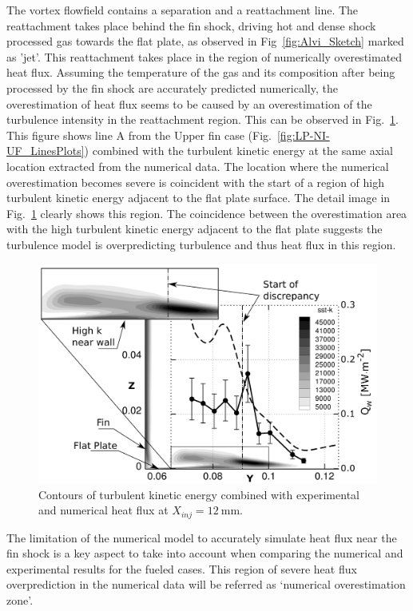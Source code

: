\documentclass{AIAA}
\begin{document}
The vortex flowfield contains a separation and a reattachment line.
The reattachment takes place behind the fin shock, driving hot and dense shock processed gas towards the flat plate, as observed in Fig~\ref{fig:Alvi_Sketch} marked as 'jet'.
This reattachment takes place in the region of numerically overestimated heat flux. 
Assuming the temperature of the gas and its composition after being processed by the fin shock are accurately predicted numerically, the overestimation of heat flux seems to be caused by an overestimation of the turbulence intensity in the reattachment region.
This can be observed in Fig.~\ref{fig:SSTk_Q_Combi}.
This figure shows line A from the Upper fin case (Fig.~\ref{fig:LP-NI-UF_LinesPlots}) combined with the turbulent kinetic energy at the same axial location extracted from the numerical data.
The location where the numerical overestimation becomes severe is coincident with the start of a region of high turbulent kinetic energy adjacent to the flat plate surface.
The detail image in Fig.~\ref{fig:SSTk_Q_Combi} clearly shows this region.
The coincidence between the overestimation area with the high turbulent kinetic energy adjacent to the flat plate suggests the turbulence model is overpredicting turbulence and thus heat flux in this region.


%
\begin{figure}[!h]
\center
\includegraphics[width=0.70\columnwidth,valign=t]{Figures/SST-K_X137_LP_NI_UF_Q_and_SSTk_Combined.pdf}
\caption{Contours of turbulent kinetic energy combined with experimental and numerical heat flux at $X_{inj} = \SI{12}{\milli\meter}$.}
\label{fig:SSTk_Q_Combi}
\end{figure} 



The limitation of the numerical model to accurately simulate heat flux near the fin shock is a key aspect to take into account when comparing the numerical and experimental results for the fueled cases. 
This region of severe heat flux overprediction in the numerical data will be referred as `numerical overestimation zone'.
\end{document}

